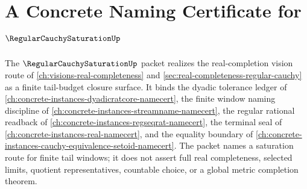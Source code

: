 \chapter{A Concrete Naming Certificate for $\RegularCauchySaturationUp$}
\label{ch:concrete-instances-regular-cauchy-saturation-namecert}

The $\RegularCauchySaturationUp$ packet realizes the real-completion vision route of \autoref{ch:visions-real-completeness} and \autoref{sec:real-completeness-regular-cauchy} as a finite tail-budget closure surface. It binds the dyadic tolerance ledger of \autoref{ch:concrete-instances-dyadicratcore-namecert}, the finite window naming discipline of \autoref{ch:concrete-instances-streamname-namecert}, the regular rational readback of \autoref{ch:concrete-instances-regseqrat-namecert}, the terminal seal of \autoref{ch:concrete-instances-real-namecert}, and the equality boundary of \autoref{ch:concrete-instances-cauchy-equivalence-setoid-namecert}. The packet names a saturation route for finite tail windows; it does not assert full real completeness, selected limits, quotient representatives, countable choice, or a global metric completion theorem.

